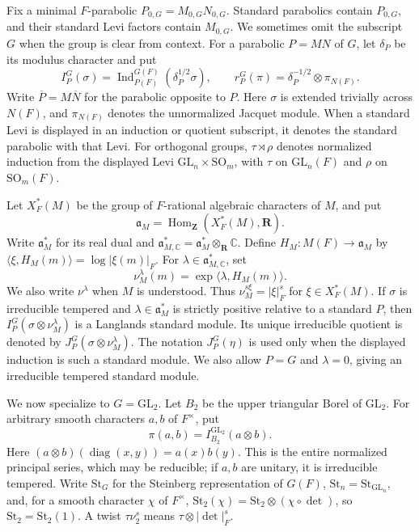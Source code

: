 \documentclass[12pt]{amsart}
\theoremstyle{definition}
\theoremstyle{plain}
\theoremstyle{remark}
\def\C{\mathbb{C}}%
\def\GL{\mathrm{GL}}
\def\SO{\mathrm{SO}}
\DeclareMathOperator{\diag}{diag} %
\DeclareMathOperator{\Hom}{Hom}%
\numberwithin{equation}{section}
\newcommand{\St}{\mathrm{St}}
\begin{document}
Fix a minimal $F$-parabolic $P_{0, G}=M_{0, G}N_{0, G}$.
Standard parabolics contain $P_{0, G}$, and their standard
Levi factors contain $M_{0, G}$.
We sometimes omit the subscript $G$ when the group is clear from context.
For a parabolic $P=MN$ of $G$, let $\delta_P$ be its modulus
character and put
\[
 I_P^G(\sigma)=
 \operatorname{Ind}_{P(F)}^{G(F)}(\delta_P^{1/2}\sigma),
 \qquad
 r_P^G(\pi)=\delta_P^{-1/2}\otimes\pi_{N(F)}.
\]
Write $\overline P=M\overline N$ for the parabolic opposite to $P$.
Here $\sigma$ is extended trivially across $N(F)$, and
$\pi_{N(F)}$ denotes the unnormalized Jacquet module.
When a standard Levi is displayed in an induction or quotient
subscript, it denotes the standard parabolic with that Levi.
For orthogonal groups, $\tau\rtimes\rho$ denotes normalized
induction from the displayed Levi $\GL_n\times\SO_m$, with
$\tau$ on $\GL_n(F)$ and $\rho$ on $\SO_m(F)$.


Let $X_F^*(M)$ be the group of $F$-rational algebraic characters
of $M$, and put
\[
 \mathfrak a_M=\Hom_{\mathbf Z}(X_F^*(M),\mathbf R).
\]
Write $\mathfrak a_M^*$ for its real dual and
$\mathfrak a_{M,\C}^*=\mathfrak a_M^*\otimes_{\mathbf R}\C$.
Define $H_M:M(F)\to\mathfrak a_M$ by
$\langle\xi,H_M(m)\rangle=\log|\xi(m)|_F$.
For $\lambda\in\mathfrak a_{M,\C}^*$, set
\[
 \nu_M^\lambda(m)=\exp\langle\lambda,H_M(m)\rangle.
\]
We also write $\nu^\lambda$ when $M$ is understood.
Thus $\nu_M^{s\xi}=|\xi|_F^s$ for $\xi\in X_F^*(M)$.
If $\sigma$ is irreducible tempered and
$\lambda\in\mathfrak a_M^*$ is strictly positive relative to a
standard $P$, then $I_P^G(\sigma\otimes\nu_M^\lambda)$ is a
Langlands standard module. Its unique irreducible quotient is
denoted by $J_P^G(\sigma\otimes\nu_M^\lambda)$.
The notation $J_P^G(\eta)$ is used only when the displayed
induction is such a standard module. We also allow $P=G$ and
$\lambda=0$, giving an irreducible tempered standard module.

We now specialize to $G = \GL_2$.
Let $B_2$ be the upper triangular Borel of $\GL_2$. For arbitrary
smooth characters $a,b$ of $F^\times$, put
\[
 \pi(a,b)=I_{B_2}^{\GL_2}(a\otimes b).
\]
Here $(a\otimes b)(\diag(x,y))=a(x)b(y)$.
This is the entire normalized principal series, which may be
reducible; if $a,b$ are unitary, it is irreducible tempered.
Write $\St_G$ for the Steinberg representation of $G(F)$,
$\St_n=\St_{\GL_n}$, and, for a smooth character $\chi$ of $F^\times$,
$\St_2(\chi)=\St_2\otimes(\chi\circ\det)$, so
$\St_2=\St_2(1)$. A twist $\tau\nu_2^s$ means
$\tau\otimes|\det|_F^s$.
\end{document}

